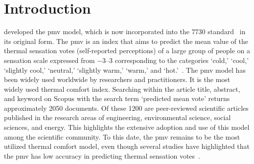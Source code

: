 \section{Introduction}\label{sec:introduction}
 developed the \ac{pmv} model, which is now incorporated into the \gls{7730} standard~\cite{iso7730} in its original form.
The \ac{pmv} is an index that aims to predict the mean value of the thermal sensation votes (self-reported perceptions) of a large group of people on a sensation scale expressed from \numrange{-3}{3} corresponding to the categories `cold,' `cool,' `slightly cool,' `neutral,' `slightly warm,' `warm,' and `hot.'~\cite{iso7730, ashrae552023}.
The \ac{pmv} model has been widely used worldwide by researchers and practitioners.
It is the most widely used thermal comfort index.
Searching within the article title, abstract, and keyword on Scopus with the search term `predicted mean vote' returns approximately \num{2050} documents.
Of these \num{1200} are peer-reviewed scientific articles published in the research areas of engineering, environmental science, social sciences, and energy.
This highlights the extensive adoption and use of this model among the scientific community.
To this date, the \ac{pmv} remains to be the most utilized thermal comfort model, even though several studies have highlighted that the \ac{pmv} has low accuracy in predicting thermal sensation votes~\cite{Cheung2019, Yao2022, Humphreys2002, doherty_evaluation_1988}.

